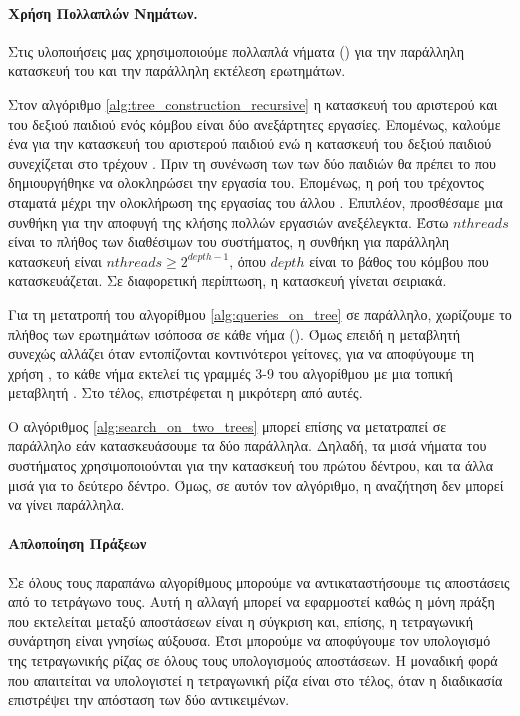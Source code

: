 \paragraph{Χρήση Πολλαπλών Νημάτων.}
Στις υλοποιήσεις μας χρησιμοποιούμε πολλαπλά νήματα ()
για την παράλληλη κατασκευή του  και την παράλληλη 
εκτέλεση ερωτημάτων.

Στον αλγόριθμο \ref{alg:tree_construction_recursive} 
η κατασκευή του αριστερού και του δεξιού παιδιού ενός κόμβου
είναι  δύο ανεξάρτητες εργασίες.
Επομένως, καλούμε ένα  για την κατασκευή του 
αριστερού παιδιού ενώ η κατασκευή του δεξιού παιδιού συνεχίζεται 
στο τρέχουν .
Πριν τη συνένωση των  των δύο παιδιών θα πρέπει 
το  που δημιουργήθηκε να ολοκληρώσει την εργασία 
του. 
Επομένως, η ροή του τρέχοντος  σταματά μέχρι την 
ολοκλήρωση της εργασίας του άλλου .
Επιπλέον, προσθέσαμε μια συνθήκη για την αποφυγή της κλήσης 
πολλών εργασιών ανεξέλεγκτα.
Έστω $nthreads$ είναι το πλήθος των διαθέσιμων 
του συστήματος, η συνθήκη για παράλληλη κατασκευή είναι 
$nthreads \geq 2^{depth-1}$, όπου $depth$ είναι το βάθος του 
κόμβου που κατασκευάζεται.
Σε διαφορετική περίπτωση, η κατασκευή γίνεται σειριακά.

Για τη μετατροπή του αλγορίθμου \ref{alg:queries_on_tree} σε 
παράλληλο, χωρίζουμε το πλήθος των ερωτημάτων ισόποσα σε κάθε 
νήμα (). 
Όμως επειδή η μεταβλητή  συνεχώς αλλάζει
όταν εντοπίζονται κοντινότεροι γείτονες, για να αποφύγουμε τη 
χρήση , το κάθε νήμα εκτελεί τις γραμμές 3-9 
του αλγορίθμου με μια τοπική μεταβλητή .
Στο τέλος, επιστρέφεται η μικρότερη από αυτές.

Ο αλγόριθμος \ref{alg:search_on_two_trees} μπορεί επίσης να 
μετατραπεί σε παράλληλο εάν κατασκευάσουμε τα δύο 
παράλληλα. Δηλαδή, τα μισά νήματα του συστήματος χρησιμοποιούνται 
για την κατασκευή του πρώτου δέντρου, και τα άλλα μισά για το δεύτερο 
δέντρο. Όμως, σε αυτόν τον αλγόριθμο, η αναζήτηση δεν μπορεί να γίνει 
παράλληλα.

\paragraph{Απλοποίηση Πράξεων}
Σε όλους τους παραπάνω αλγορίθμους μπορούμε να αντικαταστήσουμε 
τις αποστάσεις από το τετράγωνο τους.
Αυτή η αλλαγή μπορεί να εφαρμοστεί καθώς η μόνη πράξη που 
εκτελείται μεταξύ αποστάσεων είναι η σύγκριση και, επίσης,
η τετραγωνική συνάρτηση είναι γνησίως αύξουσα.
Έτσι μπορούμε να αποφύγουμε τον υπολογισμό της τετραγωνικής ρίζας 
σε όλους τους υπολογισμούς αποστάσεων.
Η μοναδική φορά που απαιτείται να υπολογιστεί η τετραγωνική ρίζα 
είναι στο τέλος, όταν η διαδικασία επιστρέψει την απόσταση των 
δύο αντικειμένων.

